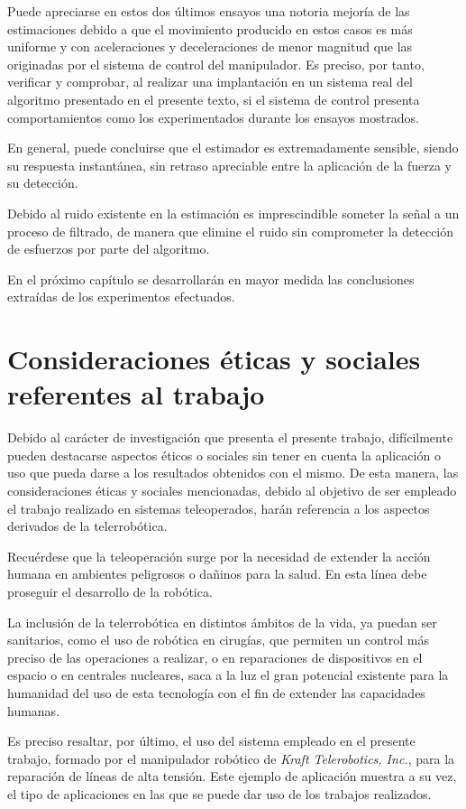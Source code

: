 Puede apreciarse en estos dos últimos ensayos una notoria mejoría de las estimaciones debido a que el movimiento producido en estos casos es más uniforme y con aceleraciones y deceleraciones de menor magnitud que las originadas por el sistema de control del manipulador. Es preciso, por tanto, verificar y comprobar, al realizar una implantación en un sistema real del algoritmo presentado en el presente texto, si el sistema de control presenta comportamientos como los experimentados durante los ensayos mostrados. \par 

En general, puede concluirse que el estimador es extremadamente sensible, siendo su respuesta instantánea, sin retraso apreciable entre la aplicación de la fuerza y su detección. \par 

Debido al ruido existente en la estimación es imprescindible someter la señal a un proceso de filtrado, de manera que elimine el ruido sin comprometer la detección de esfuerzos por parte del algoritmo. \par 

En el próximo capítulo se desarrollarán en mayor medida las conclusiones extraídas de los experimentos efectuados. \par 

\section{Consideraciones éticas y sociales referentes al trabajo}

Debido al carácter de investigación que presenta el presente trabajo, difícilmente pueden destacarse aspectos éticos o sociales sin tener en cuenta la aplicación o uso que pueda darse a los resultados obtenidos con el mismo. De esta manera, las consideraciones éticas y sociales mencionadas, debido al objetivo de ser empleado el trabajo realizado en sistemas teleoperados, harán referencia a los aspectos derivados de la telerrobótica. \par 

Recuérdese que la teleoperación surge por la necesidad de extender la acción humana en ambientes peligrosos o dañinos para la salud. En esta línea debe proseguir el desarrollo de la robótica. \par 

La inclusión de la telerrobótica en distintos ámbitos de la vida, ya puedan ser sanitarios, como el uso de robótica en cirugías, que permiten un control más preciso de las operaciones a realizar, o en reparaciones de dispositivos en el espacio o en centrales nucleares, saca a la luz el gran potencial existente para la humanidad del uso de esta tecnología con el fin de extender las capacidades humanas. \par 

Es preciso resaltar, por último, el uso del sistema empleado en el presente trabajo, formado por el manipulador robótico de \emph{Kraft Telerobotics, Inc.}, para la reparación de líneas de alta tensión. Este ejemplo de aplicación muestra a su vez, el tipo de aplicaciones en las que se puede dar uso de los trabajos realizados. \par 